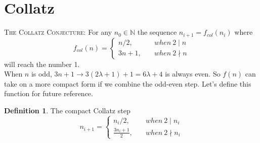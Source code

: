 \documentclass{article}
\theoremstyle{definition}
\newtheorem{definition}{Definition}[section]
\begin{document}
\section{Collatz}
\textsc{The Collatz Conjecture:} For any $n_0\in \mathbb{N}$ the sequence $n_{i+1} = f_{col}(n_i)$ where
\begin{equation*}
    f_{col}(n) = \begin{cases}
        n/2, \quad &when \ 2\mid n\\
        3n+1, \quad &when \ 2\nmid n
    \end{cases}
\end{equation*}
will reach the number 1.
%
\\[.4cm]
%
When $n$ is odd, $3n+1 \longrightarrow 3(2\lambda+1)+1 = 6\lambda+4$ is always even. So $f(n)$ can take on a more compact form if we combine the odd-even step. Let's define this function for future reference.
%
\begin{definition}
The compact Collatz step
\begin{equation}\label{eq:eq1}
    n_{i+1} = \begin{cases}
        n_i/2, \quad &when \ 2\mid n_i\\
        \frac{3n_i+1}{2}, \quad &when \ 2\nmid n_i
    \end{cases}
\end{equation}
\end{definition}
\end{document}
